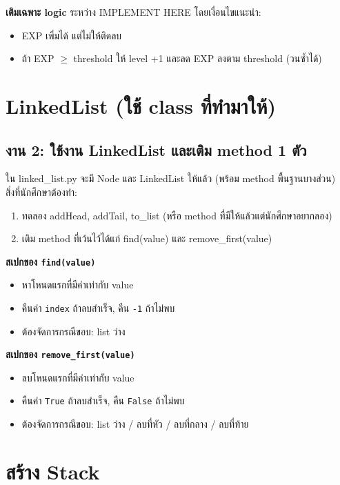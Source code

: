 \documentclass[12pt,a4paper]{article}
\newcommand{\code}[1]{\texttt{#1}}
\begin{document}
	\textbf{เติมเฉพาะ logic} ระหว่าง {IMPLEMENT HERE} โดยเงื่อนไขแนะนำ:
	\begin{itemize}
		\item EXP เพิ่มได้ แต่ไม่ให้ติดลบ
		\item ถ้า EXP $\ge$ threshold ให้ level +1 และลด EXP ลงตาม threshold (วนซ้ำได้)
	\end{itemize}
	
	\newpage
	\section{LinkedList (ใช้ class ที่ทำมาให้)}
	\subsection*{งาน 2: ใช้งาน LinkedList และเติม method 1 ตัว}
	ใน {linked\_list.py} จะมี {Node} และ {LinkedList} ให้แล้ว (พร้อม method พื้นฐานบางส่วน)\\
	สิ่งที่นักศึกษาต้องทำ:
	\begin{enumerate}[label=\arabic*.]
		\item ทดลอง {addHead}, {addTail}, {to\_list} (หรือ method ที่มีให้แล้วแต่นักศึกษาอยากลอง)
		\item เติม method ที่เว้นไว้ได้แก่ {find(value)} และ {remove\_first(value)}
	\end{enumerate}
	
	\textbf{สเปกของ \code{find(value)}}
	\begin{itemize}
		\item หาโหนดแรกที่มีค่าเท่ากับ {value}
		\item คืนค่า \code{index} ถ้าลบสำเร็จ, คืน \code{-1} ถ้าไม่พบ
		\item ต้องจัดการกรณีขอบ: list ว่าง
	\end{itemize}
	
	\textbf{สเปกของ \code{remove\_first(value)}}
	\begin{itemize}
		\item ลบโหนดแรกที่มีค่าเท่ากับ {value}
		\item คืนค่า \code{True} ถ้าลบสำเร็จ, คืน \code{False} ถ้าไม่พบ
		\item ต้องจัดการกรณีขอบ: list ว่าง / ลบที่หัว / ลบที่กลาง / ลบที่ท้าย
	\end{itemize}
	
	\newpage
	\section{สร้าง Stack}
\end{document}
